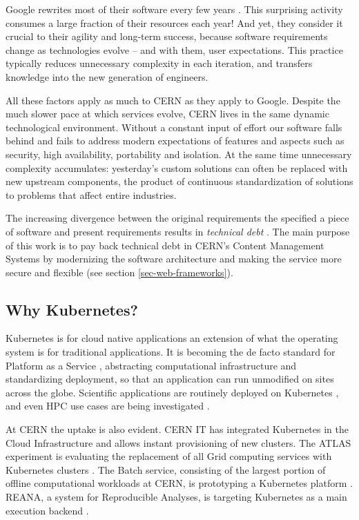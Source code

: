 Google rewrites most of their software every few years \cite{hendersonSoftwareEngineeringGoogle2020a}.
This surprising activity consumes a large fraction of their resources each year!
And yet, they consider it crucial to their agility and long-term success, because software requirements change as technologies evolve -- and with them, user expectations.
This practice typically reduces unnecessary complexity in each iteration,
and transfers knowledge into the new generation of engineers.

All these factors apply as much to CERN as they apply to Google.
Despite the much slower pace at which services evolve, CERN lives in the same dynamic technological environment.
Without a constant input of effort our software falls behind and fails to address modern expectations
of features and aspects such as security, high availability, portability and isolation.
At the same time unnecessary complexity accumulates:
yesterday's custom solutions can often be replaced with new upstream components,
the product of continuous standardization of solutions to problems that affect entire industries.

The increasing divergence between the original requirements the specified a piece of software and present requirements
results in \emph{technical debt} \cite{fairbanksUrTechnicalDebt2020a}.
The main purpose of this work is to pay back technical debt in CERN's Content Management Systems by modernizing the software architecture
and making the service more secure and flexible (see section \ref{sec-web-frameworks}).


\subsection{Why Kubernetes?}

Kubernetes is for cloud native applications an extension of what the operating system is for traditional applications.
It is becoming the de facto standard for Platform as a Service \cite{kavianiServerlessCommodityCase2019a}, abstracting computational infrastructure and standardizing deployment,
so that an application can run unmodified on sites across the globe.
Scientific applications are routinely deployed on Kubernetes \cite{banekWhyLSSTScience2019, haririBatchOnlineAnomaly2018a, yuanBioinformaticsApplicationKubeflow2020a},
and even HPC use cases are being investigated \cite{beltreEnablingHPCWorkloads2019}.

At CERN the uptake is also evident.
CERN IT has integrated Kubernetes in the Cloud Infrastructure and allows instant provisioning of new clusters.
The ATLAS experiment is evaluating the replacement of all Grid computing services with Kubernetes clusters \cite{meginoUsingKubernetesATLAS2020a}.
The Batch service, consisting of the largest portion of offline computational workloads at CERN, is prototyping a Kubernetes platform \cite{alvarezManagingCERNBatch2020a}.
REANA, a system for Reproducible Analyses, is targeting Kubernetes as a main execution backend \cite{simkoREANASystemReusable2019a}.

